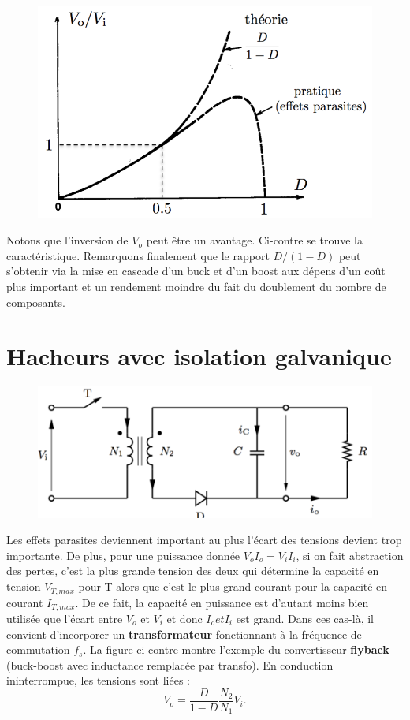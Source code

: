 		\begin{figure}
		\vspace{-5mm}
		\includegraphics[scale=0.3]{ch5/15}
		\end{figure}	
		Notons que l'inversion de $V_o$ peut être un avantage. Ci-contre se trouve la caractéristique. Remarquons finalement que le rapport $D/(1-D)$ peut s'obtenir via la mise en cascade d'un buck et d'un boost aux dépens d'un coût plus important et un rendement moindre du fait du doublement du nombre de composants. 
		
\section{Hacheurs avec isolation galvanique}
	\begin{figure}
	\vspace{-5mm}
	\includegraphics[scale=0.35]{ch5/16}
	\end{figure}	
	Les effets parasites deviennent important au plus l'écart des tensions devient trop importante. De plus, pour une puissance donnée $V_oI_o = V_iI_i$, si on fait abstraction des pertes, c'est la plus grande tension des deux qui détermine la capacité en tension $V_{T,max}$ pour T alors que c'est le plus grand courant pour la capacité en courant $I_{T,max}$. De ce fait, la capacité en puissance est d'autant moins bien utilisée que l'écart entre $V_o$ et $V_i$ et donc $I_o et I_i$ est grand. Dans ces cas-là, il convient d'incorporer un \textbf{transformateur} fonctionnant à la fréquence de commutation $f_s$. La figure ci-contre montre l'exemple du convertisseur \textbf{flyback} (buck-boost avec inductance remplacée par transfo). En conduction ininterrompue, les tensions sont liées :
	\begin{equation}
		V_o = \frac{D}{1-D}\frac{N_2}{N_1} V_i.
	\end{equation}
	
